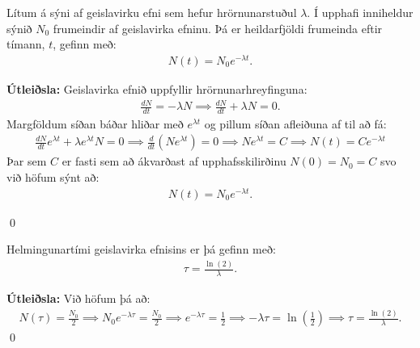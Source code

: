 \ifdefined \wholebook \else\documentclass[oneside]{book}\usepackage{EdlBook}\graphicspath{{figures/}}
\begin{document}
\begin{tcolorbox}
\begin{theorem}
Lítum á sýni af geislavirku efni sem hefur hrörnunarstuðul $\lambda$. Í upphafi inniheldur sýnið $N_0$ frumeindir af geislavirka efninu. Þá er heildarfjöldi frumeinda eftir tímann, $t$, gefinn með:
\begin{align*}
    N(t) = N_0 e^{-\lambda t}.
\end{align*}
\end{theorem}
\end{tcolorbox}

\textbf{Útleiðsla:} Geislavirka efnið uppfyllir hrörnunarhreyfinguna:
\begin{align*}
    \frac{dN}{dt} = -\lambda N \implies \frac{dN}{dt} + \lambda N = 0.
\end{align*}
Margföldum síðan báðar hliðar með $e^{\lambda t}$ og pillum síðan afleiðuna af til að fá:
\begin{align*}
    \frac{dN}{dt}e^{\lambda t} + \lambda e^{\lambda t}N = 0 \implies \frac{d}{dt}\left( Ne^{\lambda t}  \right) = 0 \implies Ne^{\lambda t} = C \implies N(t) = Ce^{-\lambda t}
\end{align*}
Þar sem $C$ er fasti sem að ákvarðast af upphafsskilirðinu $N(0) = N_0 = C$ svo við höfum sýnt að:
\begin{align*}
    N(t) = N_0 e^{-\lambda t}.
\end{align*} 

\qed

\begin{tcolorbox}
\begin{theorem}
Helmingunartími geislavirka efnisins er þá gefinn með:
\begin{align*}
    \tau = \frac{\ln(2)}{\lambda}.
\end{align*}
\end{theorem}
\end{tcolorbox}

\textbf{Útleiðsla:} Við höfum þá að:
\begin{align*}
    N(\tau) = \frac{N_0}{2} \implies N_0e^{-\lambda \tau} =  \frac{N_0}{2} \implies e^{-\lambda \tau} = \frac{1}{2} \implies -\lambda \tau = \ln(\frac{1}{2}) \implies \tau = \frac{\ln(2)}{\lambda}.
\end{align*}
\qed
\end{document}
